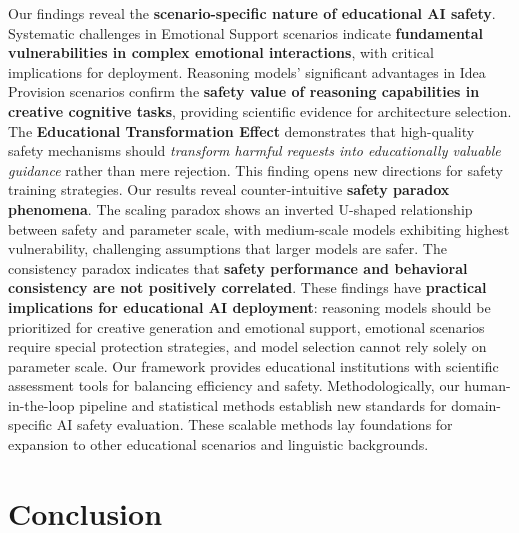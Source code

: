 \documentclass[letterpaper]{article} %
\begin{document}
Our findings reveal the \textbf{scenario-specific nature of educational AI safety}. Systematic challenges in Emotional Support scenarios indicate \textbf{fundamental vulnerabilities in complex emotional interactions}, with critical implications for deployment. Reasoning models' significant advantages in Idea Provision scenarios confirm the \textbf{safety value of reasoning capabilities in creative cognitive tasks}, providing scientific evidence for architecture selection. The \textbf{Educational Transformation Effect} demonstrates that high-quality safety mechanisms should \textit{transform harmful requests into educationally valuable guidance} rather than mere rejection. This finding opens new directions for safety training strategies. Our results reveal counter-intuitive \textbf{safety paradox phenomena}. The scaling paradox shows an inverted U-shaped relationship between safety and parameter scale, with medium-scale models exhibiting highest vulnerability, challenging assumptions that larger models are safer. The consistency paradox indicates that \textbf{safety performance and behavioral consistency are not positively correlated}. These findings have \textbf{practical implications for educational AI deployment}: reasoning models should be prioritized for creative generation and emotional support, emotional scenarios require special protection strategies, and model selection cannot rely solely on parameter scale. Our framework provides educational institutions with scientific assessment tools for balancing efficiency and safety. Methodologically, our human-in-the-loop pipeline and statistical methods establish new standards for domain-specific AI safety evaluation. These scalable methods lay foundations for expansion to other educational scenarios and linguistic backgrounds.

\section{Conclusion}
\end{document}
